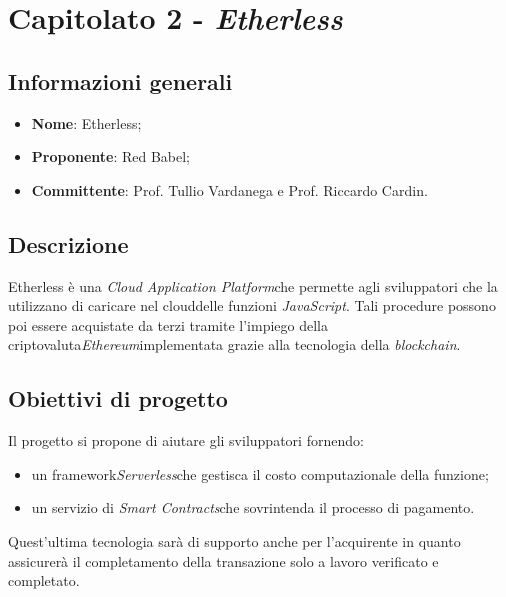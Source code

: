 \section{Capitolato 2 - \textit{Etherless}}
\subsection{Informazioni generali}
    \begin{itemize}
        \item \textbf{Nome}: Etherless;
        \item \textbf{Proponente}: Red Babel;
        \item \textbf{Committente}: Prof. Tullio Vardanega e Prof. Riccardo Cardin.
    \end{itemize}
\subsection{Descrizione}
    Etherless è una \textit{Cloud Application Platform}\glosp che permette agli sviluppatori che la utilizzano di caricare nel cloud\glosp delle funzioni
    \textit{JavaScript}\glo. Tali procedure possono poi essere acquistate da terzi tramite l'impiego della criptovaluta\glosp \textit{Ethereum}\glosp implementata
    grazie alla tecnologia della \textit{blockchain}\glo.
\subsection{Obiettivi di progetto}
    Il progetto si propone di aiutare gli sviluppatori fornendo:
    \begin{itemize}
        \item un framework\glosp \textit{Serverless}\glosp che gestisca il costo computazionale della funzione;
        \item un servizio di \textit{Smart Contracts}\glosp che sovrintenda il processo di pagamento.
    \end{itemize}
    Quest'ultima tecnologia sarà di supporto anche per l'acquirente in quanto assicurerà il completamento della transazione solo a lavoro verificato e completato.
